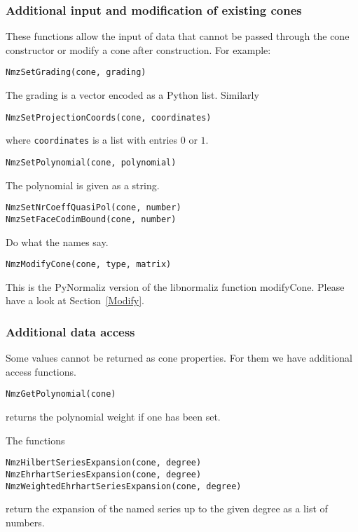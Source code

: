 \begin{small}
\subsubsection{Additional input and modification of existing cones}

These functions allow the input of data that cannot be passed through the cone constructor or modify a cone after construction. For example:
\begin{Verbatim}
NmzSetGrading(cone, grading)
\end{Verbatim}
The grading is a vector encoded as a Python list. Similarly
\begin{Verbatim}
NmzSetProjectionCoords(cone, coordinates)
\end{Verbatim}
where \verb|coordinates| is a list with entries $0$ or $1$.

\begin{Verbatim}
NmzSetPolynomial(cone, polynomial)
\end{Verbatim}
The polynomial is given as a string.

\begin{Verbatim}
NmzSetNrCoeffQuasiPol(cone, number)
NmzSetFaceCodimBound(cone, number)
\end{Verbatim}
Do what the names say.

\begin{Verbatim}
NmzModifyCone(cone, type, matrix)
\end{Verbatim}
This is the PyNormaliz version of the libnormaliz function modifyCone. Please have a look at Section~\ref{Modify}.

\subsubsection{Additional data access}

Some values cannot be returned as cone properties. For them we have additional access functions.

\begin{Verbatim}
NmzGetPolynomial(cone)
\end{Verbatim}
returns the polynomial weight if one has been set.

The functions
\begin{Verbatim}
NmzHilbertSeriesExpansion(cone, degree)
NmzEhrhartSeriesExpansion(cone, degree)
NmzWeightedEhrhartSeriesExpansion(cone, degree)
\end{Verbatim}
return the expansion of the named series up to the given degree as a list of numbers.


\end{small}

